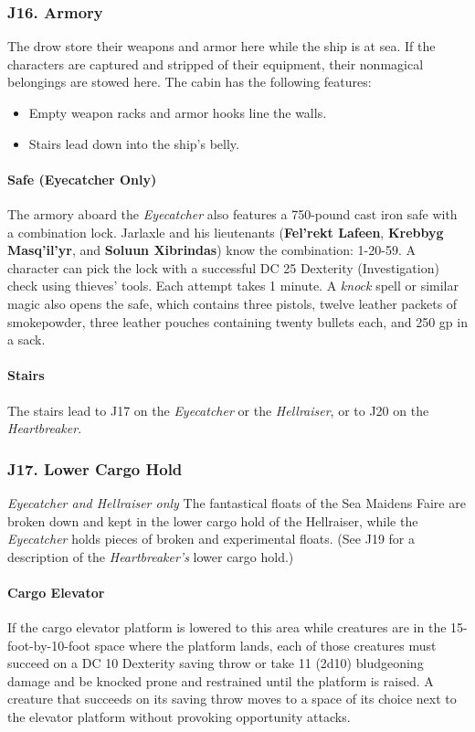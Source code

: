 \documentclass[10pt,a4paper,twoside,twocolumn,openany,nodeprecatedcode]{dndbook}
\begin{document}
\subsubsection{J16. Armory}
The drow store their weapons and armor here while the ship is at sea. If the characters are captured and stripped of their equipment, their nonmagical belongings are stowed here. The cabin has the following features:
\begin{itemize}

\item Empty weapon racks and armor hooks line the walls.
\item Stairs lead down into the ship's belly.
\end{itemize}


\paragraph{Safe (Eyecatcher Only)}
The armory aboard the \textit{Eyecatcher} also features a 750-pound cast iron safe with a combination lock. Jarlaxle and his lieutenants (\textbf{Fel'rekt Lafeen}, \textbf{Krebbyg Masq'il'yr}, and \textbf{Soluun Xibrindas}) know the combination: 1-20-59. A character can pick the lock with a successful DC 25 Dexterity (Investigation) check using thieves' tools. Each attempt takes 1 minute. A \textit{knock} spell or similar magic also opens the safe, which contains three pistols, twelve leather packets of smokepowder, three leather pouches containing twenty bullets each, and 250 gp in a sack.
\paragraph{Stairs}
The stairs lead to J17 on the \textit{Eyecatcher} or the \textit{Hellraiser}, or to J20 on the \textit{Heartbreaker}.
\subsubsection{J17. Lower Cargo Hold}
\textit{Eyecatcher and Hellraiser only}
The fantastical floats of the Sea Maidens Faire are broken down and kept in the lower cargo hold of the Hellraiser, while the \textit{Eyecatcher} holds pieces of broken and experimental floats. (See J19 for a description of the \textit{Heartbreaker's} lower cargo hold.)
\paragraph{Cargo Elevator}
If the cargo elevator platform is lowered to this area while creatures are in the 15-foot-by-10-foot space where the platform lands, each of those creatures must succeed on a DC 10 Dexterity saving throw or take 11 (2d10) bludgeoning damage and be knocked prone and restrained until the platform is raised. A creature that succeeds on its saving throw moves to a space of its choice next to the elevator platform without provoking opportunity attacks.
\end{document}
